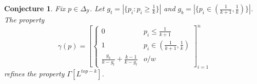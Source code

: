 \documentclass[12pt]{article}
\newcommand{\prop}[1]{\Gamma[#1]}
\newcommand{\simplex}{\Delta_\Y}
\newcommand{\Y}{\mathcal{Y}}
\newtheorem{conjecture}{Conjecture}
\begin{document}
\begin{conjecture}
	Fix $p \in \simplex$.
	Let $g_t = |\{p_i : p_i \geq \frac 1 k\}|$ and $g_b = | \{p_i \in (\frac{1}{k+1}, \frac{1}{k})\}|$.
	The property \[\gamma(p) = 
	\left[
	\begin{cases*}
	0 & p_i \leq \frac {1}{k+1}\\
	1 & p_i \in (\frac{1}{k+1}, \frac{1}{k})\\
	\frac{g_b}{k - g_t} + \frac{k-1}{k-g_t} & o/w
	\end{cases*}
	\right]_{i=1}^n
	\] refines the property $\prop{L^{top-k}}$.
\end{conjecture}
\end{document}
